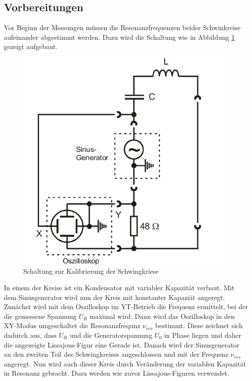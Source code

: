 \documentclass[11pt,ngerman,a4paper]{article}
\begin{document}
\subsection{Vorbereitungen}
Vor Beginn der Messungen müssen die Resonanzfrequenzen beider Schwinkreise aufeinander abgestimmt werden. Dazu wird die Schaltung wie in Abbildung \ref{abb1} gezeigt aufgebaut.
\begin{figure}[htp]
\centering
\includegraphics[scale=0.5]{Abb/abb1.png}
\caption{Schaltung zur Kalibrierung der Schwingkriese}
\label{abb1}
\end{figure}
In einem der Kreise ist ein Kondensator mit variabler Kapazität verbaut. Mit dem Sinusgenerator wird nun der Kreis mit konstanter Kapazi\"at angeregt. Zunächst wird mit dem Oszilloskop im YT-Betrieb die Frequenz ermittelt, bei der die gemessene Spannung $U_R$ maximal wird. Dann wird das Oszilloskop in den XY-Modus umgeschaltet die Resonanzfrequnz $\nu_{res}$ bestimmt. Diese zeichnet sich dadurch aus, dass $U_R$ und die Generatorspannung $U_0$ in Phase liegen und daher die angezeigte Lissajous-Figur eine Gerade ist. Danach wird der Sinusgenerator an den zweiten Teil des Schwingkreises angeschlossen und mit der Frequenz $\nu_{res}$ angeregt. Nun wird auch dieser Kreis durch Veränderung der variablen Kapazität in Resonanz gebracht. Dazu werden wie zuvor Lissajous-Figuren verwendet. 
\end{document}
